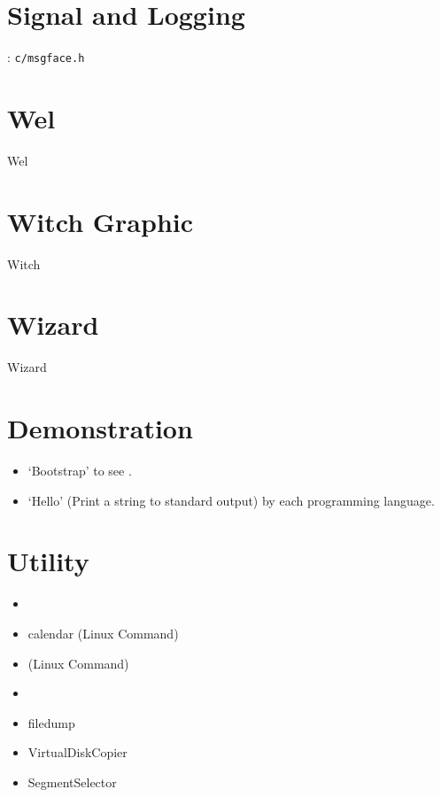 \section{Signal and Logging}

: \verb`c/msgface.h`





\section{Wel}
{Wel}

\section{Witch Graphic} 
{Witch}

\section{Wizard}
{Wizard}

\section{Demonstration}

\begin{itemize}
	\item `Bootstrap' to see .
	\item `Hello' (Print a string to standard output) by each programming language. 
\end{itemize}

\section{Utility}

\begin{itemize}
\item {}
\item {}    calendar (Linux Command)
\item {}  (Linux Command)
\item {}
\item {}  filedump
\item {}  VirtualDiskCopier
\item {} SegmentSelector
\end{itemize}


